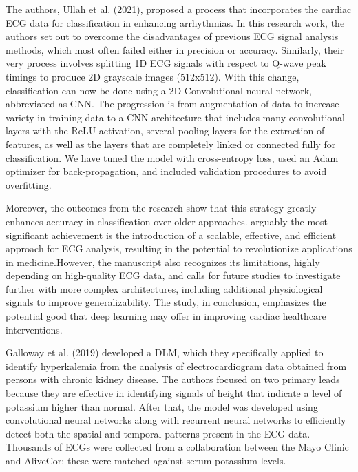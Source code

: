The authors, Ullah et al.\cite{s21030951} (2021), proposed a process that incorporates the cardiac ECG data for classification in enhancing arrhythmias. In this research work, the authors set out to overcome the disadvantages of previous ECG signal analysis methods, which most often failed either in precision or accuracy. Similarly, their very process involves splitting 1D ECG signals with respect to Q-wave peak timings to produce 2D grayscale images (512x512). With this change, classification can now be done using a 2D Convolutional neural network, abbreviated as CNN. The progression is from augmentation of data to increase variety in training data to a CNN architecture that includes many convolutional layers with the ReLU activation, several pooling layers for the extraction of features, as well as the layers that are completely linked or connected fully for classification. We have tuned the model with cross-entropy loss, used an Adam optimizer for back-propagation, and included validation procedures to avoid overfitting. 
 
\vspace{0.5cm}
Moreover, the outcomes from the research show that this strategy greatly enhances accuracy in classification over older approaches. arguably the most significant achievement is the introduction of a scalable, effective, and efficient approach for ECG analysis, resulting in the potential to revolutionize applications in medicine.However, the manuscript also recognizes its limitations, highly depending on high-quality ECG data, and calls for future studies to investigate further with more complex architectures, including additional physiological signals to improve generalizability. The study, in conclusion, emphasizes the potential good that deep learning may offer in improving cardiac healthcare interventions.
 
\vspace{0.5cm}

Galloway et al.\cite{10.1001/jamacardio.2019.0640} (2019) developed a DLM, which they specifically applied to identify hyperkalemia from the analysis of electrocardiogram data obtained from persons with chronic kidney disease. The authors focused on two primary leads because they are effective in identifying signals of height that indicate a level of potassium higher than normal. After that, the model was developed using convolutional neural networks along with recurrent neural networks to efficiently detect both the spatial and temporal patterns present in the ECG data. Thousands of ECGs were collected from a collaboration between the Mayo Clinic and AliveCor; these were matched against serum potassium levels. 
 
